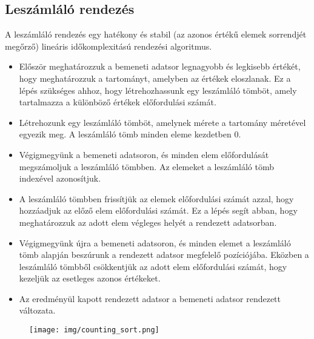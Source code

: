 \documentclass[margin=0px]{article}
\begin{document}
\subsection{Leszámláló rendezés}
A leszámláló rendezés egy hatékony és stabil (az azonos értékű elemek sorrendjét megőrző) lineáris időkomplexitású rendezési algoritmus.
\begin{itemize}
    \item Először meghatározzuk a bemeneti adatsor legnagyobb és legkisebb értékét, hogy meghatározzuk a tartományt, amelyben az értékek eloszlanak. Ez a lépés szükséges ahhoz, hogy létrehozhassunk egy leszámláló tömböt, amely tartalmazza a különböző értékek előfordulási számát.
    \item Létrehozunk egy leszámláló tömböt, amelynek mérete a tartomány méretével egyezik meg. A leszámláló tömb minden eleme kezdetben 0.
    \item Végigmegyünk a bemeneti adatsoron, és minden elem előfordulását megszámoljuk a leszámláló tömbben. Az elemeket a leszámláló tömb indexével azonosítjuk.
    \item A leszámláló tömbben frissítjük az elemek előfordulási számát azzal, hogy hozzáadjuk az előző elem előfordulási számát. Ez a lépés segít abban, hogy meghatározzuk az adott elem végleges helyét a rendezett adatsorban.
    \item Végigmegyünk újra a bemeneti adatsoron, és minden elemet a leszámláló tömb alapján beszúrunk a rendezett adatsor megfelelő pozíciójába. Eközben a leszámláló tömbből csökkentjük az adott elem előfordulási számát, hogy kezeljük az esetleges azonos értékeket.
    \item Az eredményül kapott rendezett adatsor a bemeneti adatsor rendezett változata.
\end{itemize}
\begin{figure}[H]
    \centering
    \texttt{[image: img/counting\_sort.png]}
\end{figure}
\end{document}
